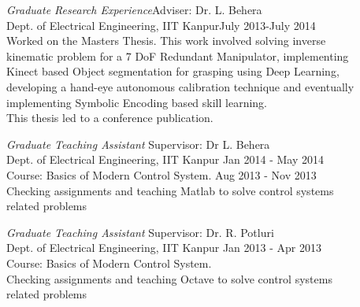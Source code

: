 \documentclass[margin,line]{resume}
\begin{document}
\begin{resume}
    \emph{Graduate Research Experience}\hfill Adviser: Dr. L. Behera\\
    Dept. of Electrical Engineering, IIT Kanpur\hfill July 2013-July 2014\\
    Worked on the Masters Thesis. This work involved solving inverse \\kinematic problem for a 7 DoF Redundant Manipulator, implementing \\Kinect based Object segmentation for grasping using Deep Learning, \\developing a hand-eye autonomous calibration technique and eventually\\ implementing Symbolic Encoding based skill learning. \\This thesis led to a conference publication.

   \emph{Graduate Teaching Assistant} \hfill Supervisor: Dr L. Behera\\
   Dept. of Electrical Engineering, IIT Kanpur \hfill Jan 2014 - May 2014\\
   Course: Basics of Modern Control System. \hfill Aug 2013 - Nov 2013\\
   Checking assignments and teaching Matlab to solve control systems\\ related problems

    \emph{Graduate Teaching Assistant} \hfill Supervisor: Dr. R. Potluri\\
   Dept. of Electrical Engineering, IIT Kanpur \hfill Jan 2013 - Apr 2013\\
   Course: Basics of Modern Control System. \\
   Checking assignments and teaching Octave to solve control systems\\ related problems


    \vspace{-2mm}




\end{resume}
\end{document}
